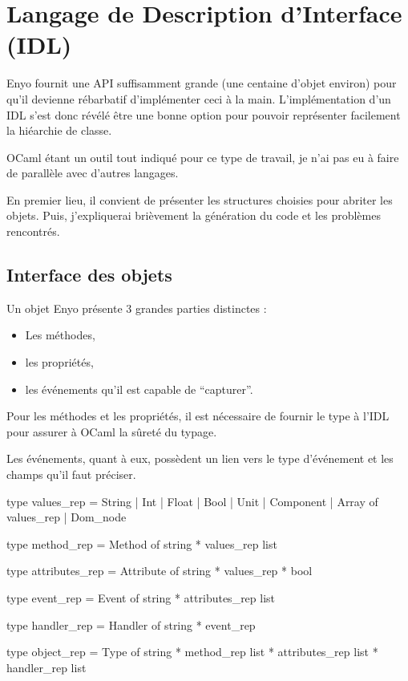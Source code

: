 \documentclass[11pt,a4paper]{report}
\begin{document}

\chapter{Langage de Description d'Interface (IDL)}\label{chap:idl}

Enyo fournit une API suffisamment grande (une centaine d'objet environ) pour qu'il devienne 
rébarbatif d'implémenter ceci à la main. L'implémentation d'un IDL s'est donc révélé être 
une bonne option pour pouvoir représenter facilement la hiéarchie de classe.

OCaml étant un outil tout indiqué pour ce type de travail, je n'ai pas eu à faire de parallèle 
avec d'autres langages.

En premier lieu, il convient de présenter les structures choisies pour abriter les objets.
Puis, j'expliquerai brièvement la génération du code et les problèmes rencontrés.

\section{Interface des objets}

Un objet Enyo présente 3 grandes parties distinctes :
\begin{itemize}
  \item Les méthodes,
  \item les propriétés,
  \item les événements qu'il est capable de ``capturer''.
\end{itemize}

Pour les méthodes et les propriétés, il est nécessaire de fournir le type à l'IDL pour assurer à
OCaml la sûreté du typage.

Les événements, quant à eux, possèdent un lien vers le type d'événement et les champs qu'il faut préciser.

\begin{OCaml}
type values_rep =  String | Int | Float | Bool | Unit 
		   | Component | Array of values_rep | Dom_node

type method_rep = Method of string * values_rep list

type attributes_rep = Attribute of string * values_rep * bool

type event_rep = Event of string * attributes_rep list

type handler_rep = Handler of string * event_rep

type object_rep = Type of string * method_rep list * attributes_rep list * handler_rep list
\end{OCaml}
\end{document}
